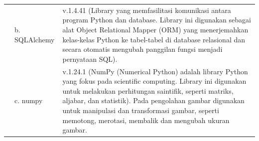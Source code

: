 \begin{singlespace}
\begin{table}[H]
\begin{tabular}{|p{1cm}|p{4cm}|p{7cm}|}
			& b. SQLAlchemy             & v.1.4.41 (Library yang memfasilitasi komunikasi antara program Python dan database. Library ini digunakan sebagai alat Object Relational Mapper (ORM) yang menerjemahkan kelas-kelas Python ke tabel-tabel di database relasional dan secara otomatis mengubah panggilan fungsi menjadi pernyataan SQL).                                          \\ \cline{2-3} 
			& c. numpy                  & v.1.24.1 (NumPy (Numerical Python) adalah library Python yang fokus pada scientific computing. Library ini digunakan untuk melakukan perhitungan saintifik, seperti matriks, aljabar, dan statistik). Pada pengolahan gambar digunakan untuk manipulasi dan transformasi gambar, seperti memotong, merotasi, membalik dan mengubah ukuran gambar. \\ \cline{2-3} \hline
		\end{tabular}
	\end{table}
\end{singlespace}

